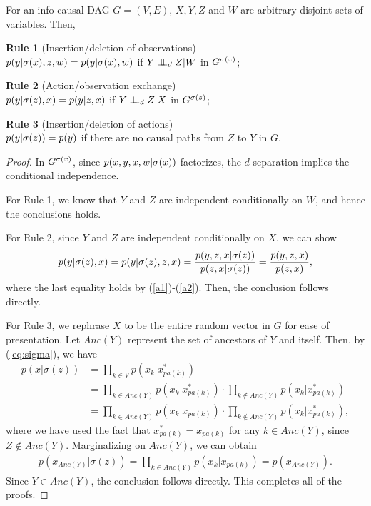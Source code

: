 \begin{Thm}
	\label{thm:rules}
	For an info-causal DAG $G=(V,E)$, $X, Y, Z$ and $W$ are arbitrary disjoint sets of variables. Then, 
	
	\textbf{Rule 1} (Insertion/deletion of observations) \\
	$p(y|\mathrm{\sigma}(x), z, w) = p(y|\mathrm{\sigma}(x), w)$ if $Y \perp\mkern-9.5mu\perp_d Z|W$ in $G^{\mathrm{\sigma}(x)}$;
	
	\textbf{Rule 2} (Action/observation exchange) \\
	$p(y|\mathrm{\sigma}(z), x) = p(y|z, x)$  if $Y\perp\mkern-9.5mu\perp_d Z|X$ in $G^{\mathrm{\sigma}(z)}$;   
	
	\textbf{Rule 3} (Insertion/deletion of actions) \\
	$p(y|\mathrm{\sigma}(z)) = p(y)$ if there are no causal paths from $Z$ to $Y$ in $G$.  
\end{Thm}

\begin{proof}
	In $G^{\mathrm{\sigma}(x)}$, since $p(x, y, x, w|\mathrm{\sigma}(x))$ factorizes, the $d$-separation implies the conditional independence.
	
	For Rule 1, we know that $Y$ and $Z$ are independent conditionally on $W$, and hence the conclusions holds.
	
	For Rule 2, since $Y$ and $Z$ are independent conditionally on $X$, we can show
	\begin{align*}
		p(y|\mathrm{\sigma}(z),x) = p(y|\mathrm{\sigma}(z),z,x) 
		= \frac{p(y, z, x |\mathrm{\sigma}(z))}{p(z, x |\mathrm{\sigma}(z))} 
		= \frac{p(y, z, x )}{p(z, x)},
	\end{align*}
where the last equality holds by (\ref{a1})-(\ref{a2}). Then, the conclusion follows directly. 

	
	For Rule 3, we rephrase $X$ to be the entire random vector in $G$ for ease of presentation. 
	Let $Anc(Y)$ represent the set of ancestors of $Y$ and itself. 
	Then, by (\ref{eq:sigma}), we have 
	 \begin{align*}
	 	p(x| \sigma(z)) &= \prod_{k \in V} p(x_k|x_{pa(k)}^*) \\
	 	&= \prod_{k \in Anc(Y)} p(x_k|x_{pa(k)}^*) \cdot  \prod_{k \notin Anc(Y)} p(x_k|x_{pa(k)}^*) \\
	 	&= \prod_{k \in Anc(Y)} p(x_k|x_{pa(k)}) \cdot  \prod_{k \notin Anc(Y)} p(x_k|x_{pa(k)}^*),
	  \end{align*}
	  where we have used the fact that 
	$x^*_{pa(k)} = x_{pa(k)}$ for any $k \in Anc(Y)$, since $Z \notin Anc(Y)$.
	 Marginalizing on $Anc(Y)$, we can obtain
	\begin{align*}
		p(x_{Anc(Y)}| \sigma(z)) = \prod_{k \in Anc(Y)} p(x_k|x_{pa(k)}) 
		= p(x_{Anc(Y)}).
	\end{align*}	 	
Since $Y \in Anc(Y)$, the conclusion follows directly. This completes all of the proofs. 
\end{proof}

